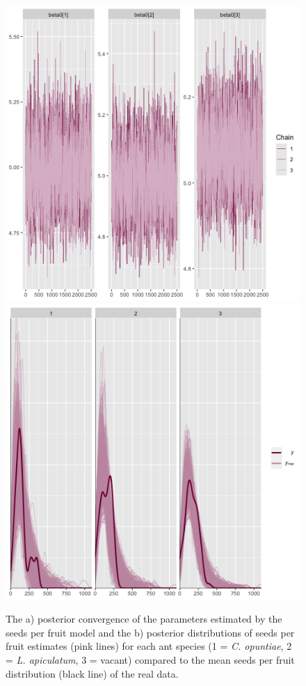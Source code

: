\documentclass[11pt]{article}
\begin{document}
\begin{figure}
\includegraphics[width = 0.45\linewidth]{Figures/seed_conv.png}
\includegraphics[width=0.45\linewidth]{Figures/seed_ant_post.png}
\caption{The a) posterior convergence of the parameters estimated by the seeds per fruit model and the b) posterior distributions of seeds per fruit estimates (pink lines) for each ant species (1 = \textit{C. opuntiae}, 2 = \textit{L. apiculatum}, 3 = vacant) compared to the mean seeds per fruit distribution (black line) of the real data.}
\label{fig:seed_post}
\end{figure}
\end{document}

